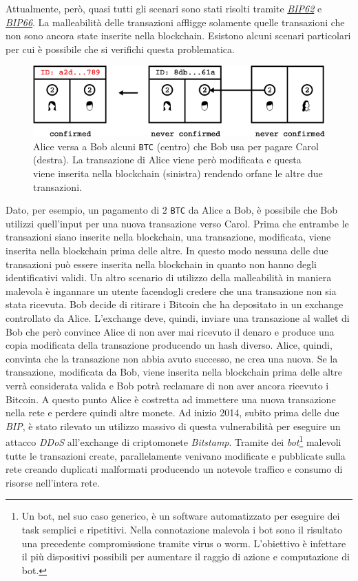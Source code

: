 Attualmente, però, quasi tutti gli scenari sono stati risolti tramite \href{https://en.bitcoin.it/wiki/BIP_0062}{\textit{BIP62}} e \href{https://en.bitcoin.it/wiki/BIP_0066}{\textit{BIP66}}.\newline
La malleabilità delle transazioni affligge solamente quelle transazioni che non sono ancora state inserite nella blockchain. Esistono alcuni scenari particolari per cui è possibile che si verifichi questa problematica.
\begin{figure}[H]
    \centering
    \includegraphics[width=\textwidth]{images/malleability.png}
    \caption{Alice versa a Bob alcuni \texttt{BTC} (centro) che Bob usa per pagare Carol (destra). La transazione di Alice viene però modificata e questa viene inserita nella blockchain (sinistra) rendendo orfane le altre due transazioni.\cite{owning}}
\end{figure}
Dato, per esempio, un pagamento di $2$ \texttt{BTC} da Alice a Bob, è possibile che Bob utilizzi quell'input per una nuova transazione verso Carol. Prima che entrambe le transazioni siano inserite nella blockchain, una transazione, modificata, viene inserita nella blockchain prima delle altre. In questo modo nessuna delle due transazioni può essere inserita nella blockchain in quanto non hanno degli identificativi validi.\newline
Un altro scenario di utilizzo della malleabilità in maniera malevola è ingannare un utente facendogli credere che una transazione non sia stata ricevuta. Bob decide di ritirare i Bitcoin che ha depositato in un exchange controllato da Alice. L'exchange deve, quindi, inviare una transazione al wallet di Bob che però convince Alice di non aver mai ricevuto il denaro e produce una copia modificata della transazione producendo un hash diverso. Alice, quindi, convinta che la transazione non abbia avuto successo, ne crea una nuova. Se la transazione, modificata da Bob, viene inserita nella blockchain prima delle altre verrà considerata valida e Bob potrà reclamare di non aver ancora ricevuto i Bitcoin. A questo punto Alice è costretta ad immettere una nuova transazione nella rete e perdere quindi altre monete.\newline
Ad inizio 2014, subito prima delle due \textit{BIP}, è stato rilevato un utilizzo massivo di questa vulnerabilità per eseguire un attacco \textit{DDoS} all'exchange di criptomonete \textit{Bitstamp}. Tramite dei \textit{bot}\footnote{Un bot, nel suo caso generico, è un software automatizzato per eseguire dei task semplici e ripetitivi. Nella connotazione malevola i bot sono il risultato una precedente compromissione tramite virus o worm. L'obiettivo è infettare il più dispositivi possibili per aumentare il raggio di azione e computazione di bot.} malevoli tutte le transazioni create, parallelamente venivano modificate e pubblicate sulla rete creando duplicati malformati producendo un notevole traffico e consumo di risorse nell'intera rete.

